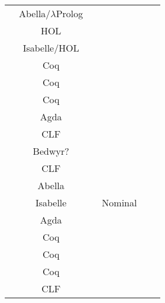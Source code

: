\begin{center}
\begin{tabular}{l|c|c|c|c|l}
  \cite{Miller2023}                  & Abella/$\lambda$Prolog &           &         &             &             \\
  \cite{Gordon1996}                  & HOL                    &           &         &             &             \\
  \cite{Gay2001}                     & Isabelle/HOL           &           &         &             &             \\
  \cite{Despeyroux2000}              & Coq                    &           &         &             &             \\
  \cite{Gillard2000}                 & Coq                    &           &         &             &             \\
  \cite{Honsell2001}                 & Coq                    &           &         &             &             \\
  \cite{Perera2018}                  & Agda                   &           &         &             &             \\
  \cite{Watkins2008}                 & CLF                    &           &         &             &             \\
  \cite{Tiu2010}                     & Bedwyr?                &           &         &             &             \\
  \cite{Cervesato2007}               & CLF                    &           &         &             &             \\
  \cite{Baelde2014}                  & Abella                 &           &         &             &             \\
  \cite{Bengtson2009}                & Isabelle               &           & Nominal &             &             \\
  \cite{Orchard2016}                 & Agda                   &           &         &             &             \\
  \cite{Castro2020}                  & Coq                    &           &         &             &             \\
  \cite{Zalakain2019}                & Coq                    &           &         &             &             \\
  \cite{Petz2016}                    & Coq                    &           &         &             &             \\
  \cite{Bock2016}                    & CLF                    &           &         &             &             \\

\end{tabular}
\end{center}
